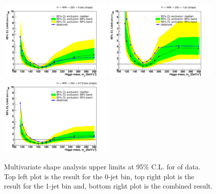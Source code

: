 
\begin{figure}[!htbp]
\begin{center}
   \includegraphics[width=0.49\textwidth]{figures/limits_0j_shape.pdf}
   \includegraphics[width=0.49\textwidth]{figures/limits_1j_shape.pdf}
   \includegraphics[width=0.49\textwidth]{figures/limits_nj_shape.pdf}
   \caption{Multivariate shape analysis upper limits at 95\% C.L. for \intlumi of data. Top left plot 
   is the result for the 0-jet bin, top right plot is the result for the 1-jet bin and, 
   bottom right plot is the combined result.}
   \label{fig:mvashape_uls_data}
\end{center}
\end{figure}

